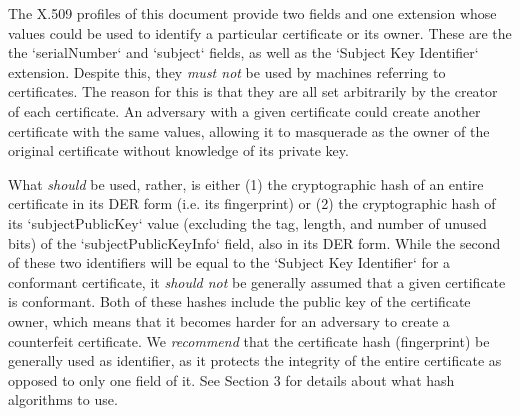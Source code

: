 %
%

The X.509 profiles of this document provide two fields and one extension whose values could be used to identify a particular certificate or its owner.
These are the the `serialNumber` and `subject` fields, as well as the `Subject Key Identifier` extension.
Despite this, they \textit{must not} be used by machines referring to certificates.
The reason for this is that they are all set arbitrarily by the creator of each certificate.
An adversary with a given certificate could create another certificate with the same values, allowing it to masquerade as the owner of the original certificate without knowledge of its private key.

What \textit{should} be used, rather, is either (1) the cryptographic hash of an entire certificate in its DER form (i.e. its fingerprint) or (2) the cryptographic hash of its `subjectPublicKey` value (excluding the tag, length, and number of unused bits) of the `subjectPublicKeyInfo` field, also in its DER form.
While the second of these two identifiers will be equal to the `Subject Key Identifier` for a conformant certificate, it \textit{should not} be generally assumed that a given certificate is conformant.
Both of these hashes include the public key of the certificate owner, which means that it becomes harder for an adversary to create a counterfeit certificate.
We \textit{recommend} that the certificate hash (fingerprint) be generally used as identifier, as it protects the integrity of the entire certificate as opposed to only one field of it.
See Section 3 for details about what hash algorithms to use.
